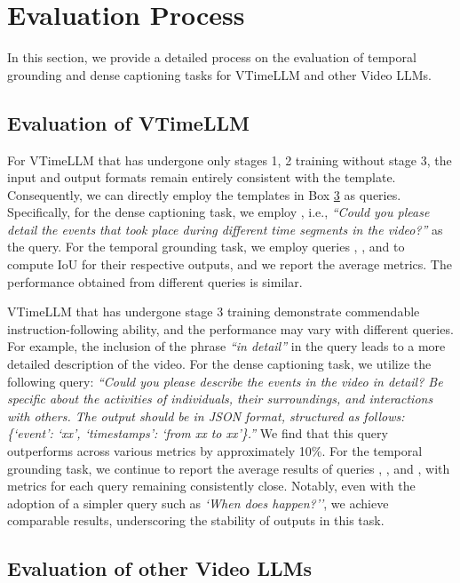 \documentclass[10pt,twocolumn,letterpaper]{article}
\begin{document}
\section{Evaluation Process}

In this section, we provide a detailed process on the evaluation of temporal grounding and dense captioning tasks for VTimeLLM and other Video LLMs.

\subsection{Evaluation of VTimeLLM}


For VTimeLLM that has undergone only stages 1, 2 training without stage 3, the input and output formats remain entirely consistent with the template. Consequently, we can directly employ the templates in Box \hyperlink{box3}{3} as queries. Specifically, for the dense captioning task, we employ , i.e., \textit{``Could you please detail the events that took place during different time segments in the video?''} as the query. For the temporal grounding task, we employ queries , , and  to compute IoU for their respective outputs, and we report the average metrics. The performance obtained from different queries is similar.

VTimeLLM that has undergone stage 3 training demonstrate commendable instruction-following ability, and the performance may vary with different queries. For example, the inclusion of the phrase \textit{``in detail''} in the query leads to a more detailed description of the video. For the dense captioning task, we utilize the following query: \textit{``Could you please describe the events in the video in detail? Be specific about the activities of individuals, their surroundings, and interactions with others. The output should be in JSON format, structured as follows: \{`event': `xx', `timestamps': `from xx to xx'\}.''} We find that this query outperforms  across various metrics by approximately 10\%. For the temporal grounding task, we continue to report the average results of queries , , and , with metrics for each query remaining consistently close. Notably, even with the adoption of a simpler query such as \textit{`When does  happen?''}, we achieve comparable results, underscoring the stability of outputs in this task.

\subsection{Evaluation of other Video LLMs}
\end{document}
